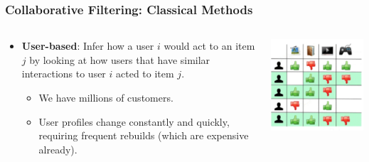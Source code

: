 \documentclass[11pt,aspectratio=169]{beamer}
\begin{document}
	\begin{frame}
		\frametitle{Collaborative Filtering: Classical Methods}
		\begin{columns}
			\begin{column}{0.5\textwidth}
				\begin{itemize}
					\item \textbf{User-based}: Infer how a user $i$ would act to an item $j$ by looking at how users that have similar interactions to user $i$ acted to item $j$.
					\begin{itemize}
						\item<2-> We have millions of customers.
						\item<3> User profiles change constantly and quickly, requiring frequent rebuilds (which are expensive already).
					\end{itemize}
				\end{itemize}
			\end{column}
			\begin{column}{0.5\textwidth}
				\begin{center}
					\centering
					\includegraphics[width=\textwidth]{images/cf-stage3.png}
				\end{center}
			\end{column}
		\end{columns}
	\end{frame}
\end{document}
